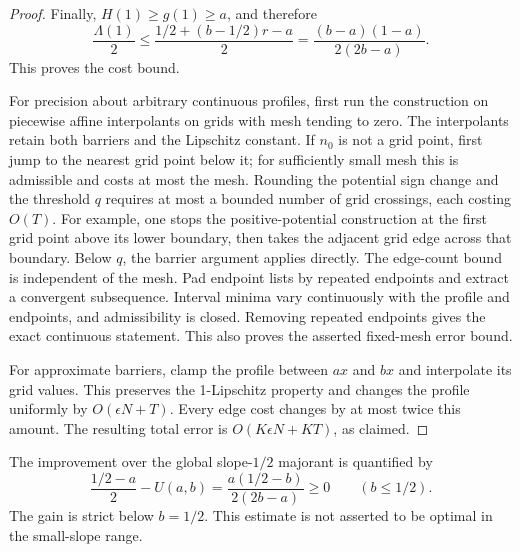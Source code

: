\begin{proof}
Finally, \(H(1)\ge g(1)\ge a\), and therefore
$$
 \frac{\Lambda(1)}2
 \le\frac{1/2+(b-1/2)r-a}{2}
 =\frac{(b-a)(1-a)}{2(2b-a)}.
$$
This proves the cost bound.

For precision about arbitrary continuous profiles, first run the construction
on piecewise affine interpolants on grids with mesh tending to zero.
The interpolants retain both barriers and the Lipschitz constant. If
\(n_0\) is not a grid point, first jump to the nearest grid point below
it; for sufficiently small mesh this is admissible and costs at most the
mesh. Rounding
the potential sign change and the threshold \(q\) requires at most a
bounded number of grid crossings, each costing \(O(T)\). For example,
one stops the positive-potential construction at the first grid point above
its lower boundary, then takes the adjacent grid edge across that boundary.
Below \(q\), the barrier argument applies directly. The edge-count bound
is independent of the mesh. Pad endpoint lists by repeated endpoints and
extract a convergent subsequence. Interval minima vary continuously with
the profile and endpoints, and admissibility is closed. Removing repeated
endpoints gives the exact continuous statement. This also proves the
asserted fixed-mesh error bound.

For approximate barriers, clamp the profile between \(ax\) and \(bx\)
and interpolate its grid values. This preserves the 1-Lipschitz property
and changes the profile uniformly by \(O(\epsilon N+T)\). Every edge
cost changes by at most twice this amount. The resulting total error is
\(O(K\epsilon N+KT)\), as claimed.
\end{proof}

The improvement over the global slope-\(1/2\) majorant is quantified by
$$
 \frac{1/2-a}{2}-U(a,b)
 =\frac{a(1/2-b)}{2(2b-a)}\ge0\qquad(b\le1/2).
$$
The gain is strict below \(b=1/2\). This estimate is not asserted to be
optimal in the small-slope range.
